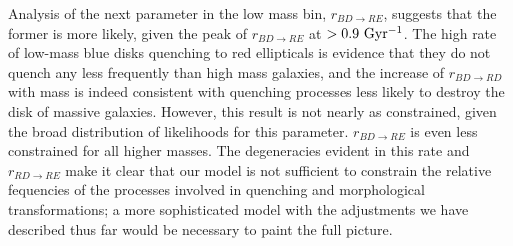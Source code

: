 \documentclass[useAMS,usenatbib]{mn2e}
\begin{document}
 Analysis of the next parameter in the low mass bin, $r_{BD\rightarrow RE}$, suggests that the former is more likely, given the peak of $r_{BD \rightarrow RE}$ at $>0.9 ~\rm Gyr^{-1}$. The high rate of low-mass blue disks quenching to red ellipticals is evidence that they do not quench any less frequently than high mass galaxies, and the increase of $r_{BD \rightarrow RD}$ with mass is indeed consistent with quenching processes less likely to destroy the disk of massive galaxies. However, this result is not nearly as constrained, given the broad distribution of likelihoods for this parameter. $r_{BD \rightarrow RE}$ is even less constrained for all higher masses. The degeneracies evident in this rate and $r_{RD \rightarrow RE}$ make it clear that our model is not sufficient to constrain the relative fequencies of the processes involved in quenching and morphological transformations; a more sophisticated model with the adjustments we have described thus far would be necessary to paint the full picture. 

\end{document}
